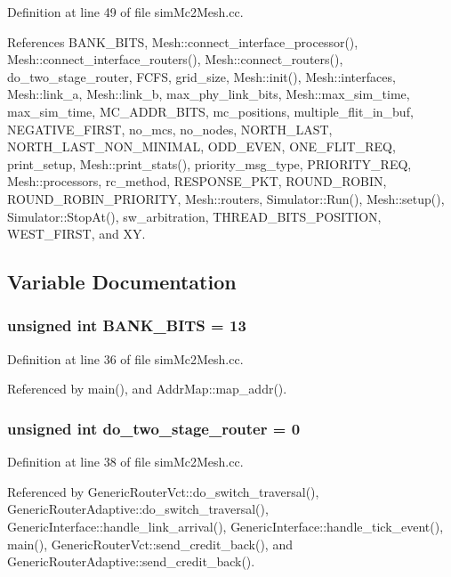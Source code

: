 Definition at line 49 of file simMc2Mesh.cc.

References BANK\_\-BITS, Mesh::connect\_\-interface\_\-processor(), Mesh::connect\_\-interface\_\-routers(), Mesh::connect\_\-routers(), do\_\-two\_\-stage\_\-router, FCFS, grid\_\-size, Mesh::init(), Mesh::interfaces, Mesh::link\_\-a, Mesh::link\_\-b, max\_\-phy\_\-link\_\-bits, Mesh::max\_\-sim\_\-time, max\_\-sim\_\-time, MC\_\-ADDR\_\-BITS, mc\_\-positions, multiple\_\-flit\_\-in\_\-buf, NEGATIVE\_\-FIRST, no\_\-mcs, no\_\-nodes, NORTH\_\-LAST, NORTH\_\-LAST\_\-NON\_\-MINIMAL, ODD\_\-EVEN, ONE\_\-FLIT\_\-REQ, print\_\-setup, Mesh::print\_\-stats(), priority\_\-msg\_\-type, PRIORITY\_\-REQ, Mesh::processors, rc\_\-method, RESPONSE\_\-PKT, ROUND\_\-ROBIN, ROUND\_\-ROBIN\_\-PRIORITY, Mesh::routers, Simulator::Run(), Mesh::setup(), Simulator::StopAt(), sw\_\-arbitration, THREAD\_\-BITS\_\-POSITION, WEST\_\-FIRST, and XY.

\subsection{Variable Documentation}
\subsubsection[{BANK\_\-BITS}]{\setlength{\rightskip}{0pt plus 5cm}unsigned int {\bf BANK\_\-BITS} = 13}\label{simMc2Mesh_8cc_4dead09fbe9da04753765df2d1dc54dd}




Definition at line 36 of file simMc2Mesh.cc.

Referenced by main(), and AddrMap::map\_\-addr().
\subsubsection[{do\_\-two\_\-stage\_\-router}]{\setlength{\rightskip}{0pt plus 5cm}unsigned int {\bf do\_\-two\_\-stage\_\-router} = 0}\label{simMc2Mesh_8cc_f584a3fbd576b0061c6c726603cea3e4}




Definition at line 38 of file simMc2Mesh.cc.

Referenced by GenericRouterVct::do\_\-switch\_\-traversal(), GenericRouterAdaptive::do\_\-switch\_\-traversal(), GenericInterface::handle\_\-link\_\-arrival(), GenericInterface::handle\_\-tick\_\-event(), main(), GenericRouterVct::send\_\-credit\_\-back(), and GenericRouterAdaptive::send\_\-credit\_\-back().
